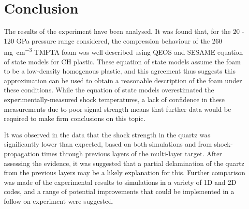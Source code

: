 \section{Conclusion}
The results of the experiment have been analysed. It was found that, for the 20 - 120 \unit{\giga\pascal} pressure range considered, the compression behaviour of the 260 \unit{\milli\gram\per\centi\meter\cubed} TMPTA foam was well described using QEOS and SESAME equation of state models for CH plastic. These equation of state models assume the foam to be a low-density homogenous plastic, and this agreement thus suggests this approximation can be used to obtain a reasonable description of the foam under these conditions. While the equation of state models overestimated the experimentally-measured shock temperatures, a lack of confidence in these measurements due to poor signal strength means that further data would be required to make firm conclusions on this topic.

It was observed in the data that the shock strength in the quartz was significantly lower than expected, based on both simulations and from shock-propagation times through previous layers of the multi-layer target. After assessing the evidence, it was suggested that a partial delamination of the quartz from the previous layers may be a likely explanation for this. Further comparison was made of the experimental results to simulations in a variety of 1D and 2D codes, and a range of potential improvements that could be implemented in a follow on experiment were suggested.